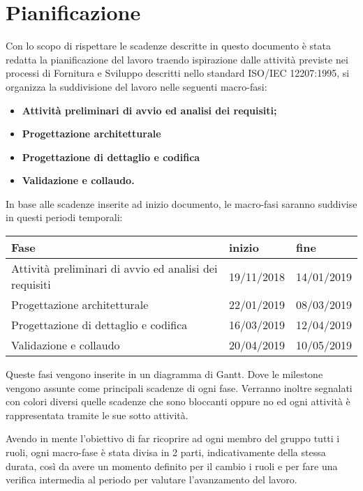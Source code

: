 \section{Pianificazione}

	Con lo scopo di rispettare le scadenze descritte in questo documento è stata redatta la pianificazione del lavoro traendo ispirazione dalle attività previste nei processi di Fornitura e Sviluppo descritti nello standard ISO/IEC 12207:1995, si organizza la suddivisione del lavoro nelle seguenti macro-fasi:
	\begin{itemize}
		\item{\textbf{Attività preliminari di avvio ed analisi dei requisiti;}}
		\item{\textbf{Progettazione architetturale}}
		\item{\textbf{Progettazione di dettaglio e codifica}}
		\item{\textbf{Validazione e collaudo.}}
	\end{itemize} 
	
	In base alle scadenze inserite ad inizio documento, le macro-fasi saranno suddivise in questi periodi temporali:
	 \newline
	\begin{tabular}{|l|l|l|}
		\hline
		\textbf{Fase} & \textbf{inizio} & \textbf{fine}\\
		\hline
		Attività preliminari di avvio ed analisi dei requisiti & 19/11/2018 & 14/01/2019 \\
		\hline
		Progettazione architetturale & 22/01/2019 & 08/03/2019\\
		\hline
		Progettazione di dettaglio e codifica & 16/03/2019 & 12/04/2019\\
		\hline
		Validazione e collaudo & 20/04/2019 & 10/05/2019\\
		\hline
	\end{tabular}
	\newline
	Queste fasi vengono inserite in un diagramma di Gantt. Dove le milestone vengono assunte come principali scadenze di ogni fase. Verranno inoltre segnalati con colori diversi quelle scadenze che sono bloccanti oppure no ed  ogni attività è rappresentata tramite le sue sotto attività.
	
	Avendo in mente l'obiettivo di far ricoprire ad ogni membro del gruppo tutti i ruoli, ogni macro-fase è stata divisa in 2 parti, indicativamente della stessa durata, così da avere un momento definito per il cambio i ruoli e per fare una verifica intermedia al periodo per valutare l'avanzamento del lavoro. 
	

